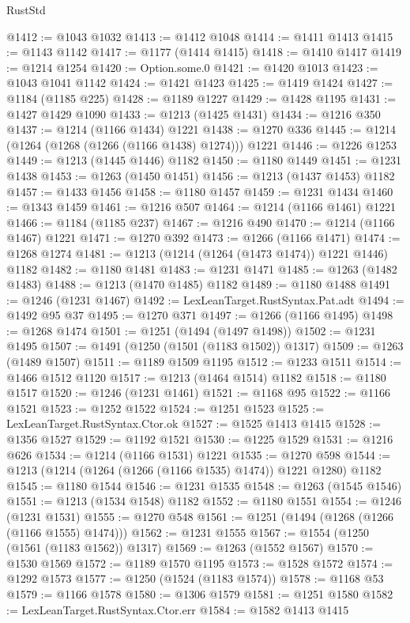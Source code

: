 \begin{lexlean}{RustStd}
\begin{coremodule}
@1412 := @1043 @1032
@1413 := @1412 @1048
@1414 := @1411 @1413
@1415 := @1143 @1142
@1417 := @1177 (@1414 @1415)
@1418 := @1410 @1417
@1419 := @1214 @1254
@1420 := Option.some.{0}
@1421 := @1420 @1013
@1423 := @1043 @1041 @1142
@1424 := @1421 @1423
@1425 := @1419 @1424
@1427 := @1184 (@1185 @225)
@1428 := @1189 @1227
@1429 := @1428 @1195
@1431 := @1427 @1429 @1090
@1433 := @1213 (@1425 @1431)
@1434 := @1216 @350
@1437 := @1214 (@1166 @1434) @1221
@1438 := @1270 @336
@1445 := @1214 (@1264 (@1268 (@1266 (@1166 @1438) @1274))) @1221
@1446 := @1226 @1253
@1449 := @1213 (@1445 @1446) @1182
@1450 := @1180 @1449
@1451 := @1231 @1438
@1453 := @1263 (@1450 @1451)
@1456 := @1213 (@1437 @1453) @1182
@1457 := @1433 @1456
@1458 := @1180 @1457
@1459 := @1231 @1434
@1460 := @1343 @1459
@1461 := @1216 @507
@1464 := @1214 (@1166 @1461) @1221
@1466 := @1184 (@1185 @237)
@1467 := @1216 @490
@1470 := @1214 (@1166 @1467) @1221
@1471 := @1270 @392
@1473 := @1266 (@1166 @1471)
@1474 := @1268 @1274
@1481 := @1213 (@1214 (@1264 (@1473 @1474)) @1221 @1446) @1182
@1482 := @1180 @1481
@1483 := @1231 @1471
@1485 := @1263 (@1482 @1483)
@1488 := @1213 (@1470 @1485) @1182
@1489 := @1180 @1488
@1491 := @1246 (@1231 @1467)
@1492 := LexLeanTarget.RustSyntax.Pat.adt
@1494 := @1492 @95 @37
@1495 := @1270 @371
@1497 := @1266 (@1166 @1495)
@1498 := @1268 @1474
@1501 := @1251 (@1494 (@1497 @1498))
@1502 := @1231 @1495
@1507 := @1491 (@1250 (@1501 (@1183 @1502)) @1317)
@1509 := @1263 (@1489 @1507)
@1511 := @1189 @1509 @1195
@1512 := @1233 @1511
@1514 := @1466 @1512 @1120
@1517 := @1213 (@1464 @1514) @1182
@1518 := @1180 @1517
@1520 := @1246 (@1231 @1461)
@1521 := @1168 @95
@1522 := @1166 @1521
@1523 := @1252 @1522
@1524 := @1251 @1523
@1525 := LexLeanTarget.RustSyntax.Ctor.ok
@1527 := @1525 @1413 @1415
@1528 := @1356 @1527
@1529 := @1192 @1521
@1530 := @1225 @1529
@1531 := @1216 @626
@1534 := @1214 (@1166 @1531) @1221
@1535 := @1270 @598
@1544 := @1213 (@1214 (@1264 (@1266 (@1166 @1535) @1474)) @1221 @1280) @1182
@1545 := @1180 @1544
@1546 := @1231 @1535
@1548 := @1263 (@1545 @1546)
@1551 := @1213 (@1534 @1548) @1182
@1552 := @1180 @1551
@1554 := @1246 (@1231 @1531)
@1555 := @1270 @548
@1561 := @1251 (@1494 (@1268 (@1266 (@1166 @1555) @1474)))
@1562 := @1231 @1555
@1567 := @1554 (@1250 (@1561 (@1183 @1562)) @1317)
@1569 := @1263 (@1552 @1567)
@1570 := @1530 @1569
@1572 := @1189 @1570 @1195
@1573 := @1528 @1572
@1574 := @1292 @1573
@1577 := @1250 (@1524 (@1183 @1574))
@1578 := @1168 @53
@1579 := @1166 @1578
@1580 := @1306 @1579
@1581 := @1251 @1580
@1582 := LexLeanTarget.RustSyntax.Ctor.err
@1584 := @1582 @1413 @1415

\end{coremodule}
\end{lexlean}
